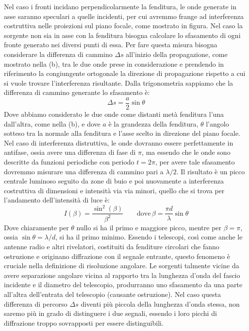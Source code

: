 \documentclass[a4paper,twoside,openany,notitlepage]{book}
\theoremstyle{definition}
\theoremstyle{plain}
\begin{document}
Nel caso i fronti incidano perpendicolarmente la fenditura, le onde generate in asse saranno speculari a quelle incidenti, per cui avremmo frange ad interferenza costruttiva nelle proiezioni sul piano focale, come mostrato in figura. Nel caso la sorgente non sia in asse con la fenditura bisogna calcolare lo sfasamento di ogni fronte generato nei diversi punti di essa. Per fare questa misura bisogna considerare la differenza di cammino $\Delta s$ all'inizio della propagazione, come mostrato nella (b), tra le due onde prese in considerazione e prendendo in riferimento la congiungente ortogonale la direzione di propagazione rispetto a cui si vuole trovare l'interferenza risultante. Dalla trigonometria sappiamo che la differenza di cammino generante lo sfasamento è:
\begin{equation*}
	\Delta s = \frac{a}{2}\sin\theta
\end{equation*}
Dove abbiamo considerato le due onde come distanti metà fenditura l'una dall'altra, come nella (b), e dove $a$ è la grandezza della fenditura, $\theta$ l'angolo sotteso tra la normale alla fenditura e l'asse scelto in direzione del piano focale. Nel caso di interferenza distruttiva, le onde dovranno essere perfettamente in antifase, ossia avere una differenza di fase di $\pi$, ma essendo che le onde sono descritte da funzioni periodiche con periodo $t=2\pi$, per avere tale sfasamento dovremmo misurare una differenza di cammino pari a $\lambda/2$. Il risultato è un picco centrale luminoso seguito da zone di buio e poi nuovamente a interferenza costruttiva di dimensioni e intensità via via minori, quello che si trova per l'andamento dell'intensità di luce è:
\begin{equation*}
	I(\beta) = \frac{\sin^2(\beta)}{\beta^2} \qquad \text{dove} \,
	\beta = \frac{\pi d}{\lambda}\sin\theta
\end{equation*}
Dove chiaramente per $\theta$ nullo si ha il primo e maggiore picco, mentre per $\beta=\pi$, ossia $\sin\theta=\lambda/d$, si ha il primo minimo. Essendo i telescopi, così come anche le antenne radio e altri rivelatori, costituiti da fenditure circolari che fanno ostruzione e originano diffrazione con il segnale entrante, questo fenomeno è cruciale nella definizione di risoluzione angolare. Le sorgenti talmente vicine da avere separazione angolare vicina al rapporto tra la lunghezza d'onda del fascio incidente e il diametro del telescopio, produrranno uno sfasamento da una parte all'altra dell'entrata del telescopio (causante ostruzione). Nel caso questa differenza di percorso $\Delta s$ diventi più piccola della lunghezza d'onda stessa, non saremo più in grado di distinguere i due segnali, essendo i loro picchi di diffrazione troppo sovrapposti per essere distinguibili.
\end{document}
